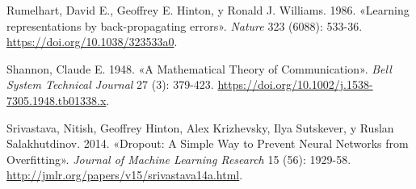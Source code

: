 \documentclass[
  spanish,
  us-letterpaper,
]{scrreprt}
\newlength{\cslhangindent}
\newenvironment{CSLReferences}[2] %
 {\begin{list}{}{%
  \setlength{\itemindent}{0pt}
  \setlength{\leftmargin}{0pt}
  \setlength{\parsep}{0pt}
  \ifodd #1
   \setlength{\leftmargin}{\cslhangindent}
   \setlength{\itemindent}{-1\cslhangindent}
  \fi
  \setlength{\itemsep}{#2\baselineskip}}}
 {\end{list}}
\theoremstyle{definition}
\theoremstyle{remark}
\begin{document}
\begin{CSLReferences}{1}{0}
Rumelhart, David E., Geoffrey E. Hinton, y Ronald J. Williams. 1986.
{«Learning representations by back-propagating errors»}. \emph{Nature}
323 (6088): 533-36. \url{https://doi.org/10.1038/323533a0}.

Shannon, Claude E. 1948. {«A Mathematical Theory of Communication»}.
\emph{Bell System Technical Journal} 27 (3): 379-423.
\url{https://doi.org/10.1002/j.1538-7305.1948.tb01338.x}.

Srivastava, Nitish, Geoffrey Hinton, Alex Krizhevsky, Ilya Sutskever, y
Ruslan Salakhutdinov. 2014. {«Dropout: A Simple Way to Prevent Neural
Networks from Overfitting»}. \emph{Journal of Machine Learning Research}
15 (56): 1929-58. \url{http://jmlr.org/papers/v15/srivastava14a.html}.

\end{CSLReferences}
\end{document}
